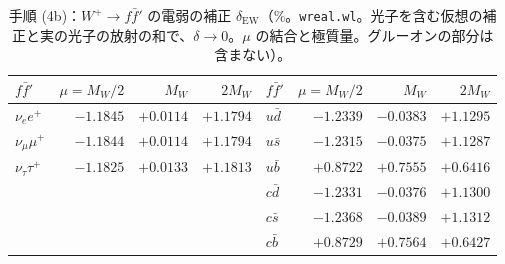 \documentclass[a4paper,10pt]{ltjsarticle}
\begin{document}
\begin{table}[tbp]
\centering\small
\caption{手順 (4b)：$W^+\to f\bar f'$ の電弱の補正 $\delta_{\mathrm{EW}}$（$\%$。\texttt{wreal.wl}。光子を含む仮想の補正と実の光子の放射の和で、$\delta\to0$。$\mu$ の結合と極質量。グルーオンの部分は含まない）。}
\label{tab:wweak}
\begin{tabular}{lrrr|lrrr}
\toprule
$f\bar f'$ & $\mu=M_W/2$ & $M_W$ & $2M_W$ & $f\bar f'$ & $\mu=M_W/2$ & $M_W$ & $2M_W$ \\
\midrule
$\nu_ee^+$ & $-1.1845$ & $+0.0114$ & $+1.1794$ & $u\bar d$ & $-1.2339$ & $-0.0383$ & $+1.1295$ \\
$\nu_\mu\mu^+$ & $-1.1844$ & $+0.0114$ & $+1.1794$ & $u\bar s$ & $-1.2315$ & $-0.0375$ & $+1.1287$ \\
$\nu_\tau\tau^+$ & $-1.1825$ & $+0.0133$ & $+1.1813$ & $u\bar b$ & $+0.8722$ & $+0.7555$ & $+0.6416$ \\
 & & & & $c\bar d$ & $-1.2331$ & $-0.0376$ & $+1.1300$ \\
 & & & & $c\bar s$ & $-1.2368$ & $-0.0389$ & $+1.1312$ \\
 & & & & $c\bar b$ & $+0.8729$ & $+0.7564$ & $+0.6427$ \\
\bottomrule
\end{tabular}
\end{table}
\end{document}
